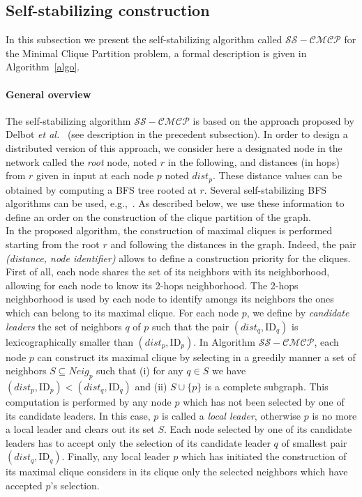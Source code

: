 \documentclass[11pt,letterpaper,onecolumn]{article}
\newcommand{\id}{\mbox{ID}}
\begin{document}
\subsection{Self-stabilizing construction}

In this subsection we present the self-stabilizing algorithm called $\mathcal{SS-CMCP}$ for the Minimal Clique Partition problem, a formal description is given in Algorithm~\ref{algo}.

\paragraph{General overview}

The self-stabilizing algorithm $\mathcal{SS-CMCP}$ is based on the approach proposed by Delbot \emph{et al.}~\cite{DelbotLP13} (see description in the precedent subsection). In order to design a distributed version of this approach, we consider here a designated node in the network called the \emph{root} node, noted $r$ in the following, and distances (in hops) from $r$ given in input at each node $p$ noted $dist_p$. These distance values can be obtained by computing a BFS tree rooted at $r$. Several self-stabilizing BFS algorithms can be used, e.g.,~\cite{HuangC92,DolevIM93,Johnen97,CournierRV11}. As described below, we use these information to define an order on the construction of the clique partition of the graph.\\
In the proposed algorithm, the construction of maximal cliques is performed starting from the root $r$ and following the distances in the graph. Indeed, the pair \emph{(distance, node identifier)} allows to define a construction priority for the cliques. First of all, each node shares the set of its neighbors with its neighborhood, allowing for each node to know its 2-hops neighborhood. The 2-hops neighborhood is used by each node to identify amongs its neighbors the ones which can belong to its maximal clique. For each node $p$, we define by \emph{candidate leaders} the set of neighbors $q$ of $p$ such that the pair $(dist_q, \id_q)$ is lexicographically smaller than $(dist_p, \id_p)$. In Algorithm $\mathcal{SS-CMCP}$, each node $p$ can construct its maximal clique by selecting in a greedily manner a set of neighbors $S \subseteq Neig_p$ such that (i) for any $q \in S$ we have $(dist_p, \id_p)<(dist_q, \id_q)$ and (ii) $S \cup \{p\}$ is a complete subgraph. This computation is performed by any node $p$ which has not been selected by one of its candidate leaders. In this case, $p$ is called a \emph{local leader}, otherwise $p$ is no more a local leader and clears out its set $S$. Each node selected by one of its candidate leaders has to accept only the selection of its candidate leader $q$ of smallest pair $(dist_q, \id_q)$. Finally, any local leader $p$ which has initiated the construction of its maximal clique considers in its clique only the selected neighbors which have accepted $p$'s selection.\\
\end{document}
